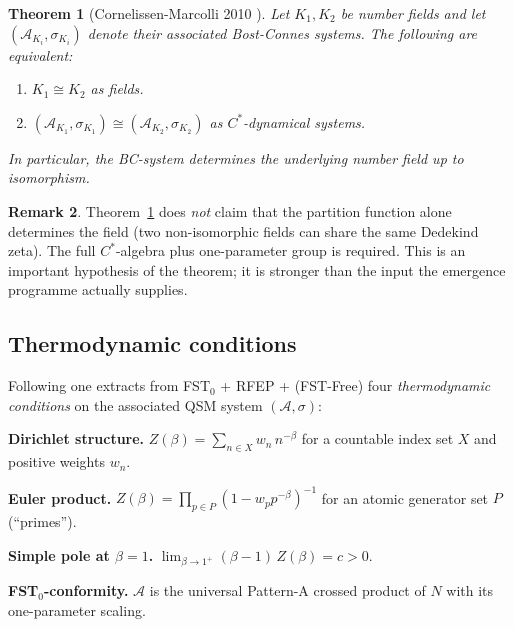 \documentclass[11pt,a4paper]{article}
\theoremstyle{plain}
\newtheorem{theorem}{Theorem}[section]
\theoremstyle{definition}
\newtheorem{remark}[theorem]{Remark}
\begin{document}
\begin{theorem}[Cornelissen-Marcolli
2010 \cite{CornelissenMarcolli2010}]\label{thm:cm-rigidity}
Let $K_1, K_2$ be number fields and let $(\mathcal A_{K_i},
\sigma_{K_i})$ denote their associated Bost-Connes systems.  The
following are equivalent:
\begin{enumerate}[label=(\roman*)]
\item $K_1 \cong K_2$ as fields.
\item $(\mathcal A_{K_1}, \sigma_{K_1}) \cong (\mathcal A_{K_2},
  \sigma_{K_2})$ as $C^\ast$-dynamical systems.
\end{enumerate}
In particular, the BC-system determines the underlying number field
up to isomorphism.
\end{theorem}

\begin{remark}
Theorem~\ref{thm:cm-rigidity} does \emph{not} claim that the
partition function alone determines the field (two non-isomorphic
fields can share the same Dedekind zeta).  The full $C^\ast$-algebra
plus one-parameter group is required.  This is an important
hypothesis of the theorem; it is stronger than the input the
emergence programme actually supplies.
\end{remark}

\subsection{Thermodynamic conditions}
\label{sec:thermo-B}

Following \cite{LemmaThreeTwo,ThermoDerivation} one extracts from
FST$_0$ + RFEP + (FST-Free) four \emph{thermodynamic conditions} on
the associated QSM system $(\mathcal A, \sigma)$:

\begin{description}[leftmargin=*,style=nextline]
\item[(B1)] \textbf{Dirichlet structure.} $Z(\beta) = \sum_{n \in X}
  w_n\, n^{-\beta}$ for a countable index set $X$ and positive
  weights $w_n$.
\item[(B2)] \textbf{Euler product.} $Z(\beta) = \prod_{p \in P}
  (1-w_p p^{-\beta})^{-1}$ for an atomic generator set $P$
  (``primes'').
\item[(B3)] \textbf{Simple pole at $\beta=1$.} $\lim_{\beta \to 1^+}
  (\beta-1)\, Z(\beta) = c > 0$.
\item[(B4)] \textbf{FST$_0$-conformity.} $\mathcal A$ is the
  universal Pattern-A crossed product of $N$ with its one-parameter
  scaling.
\end{description}
\end{document}
